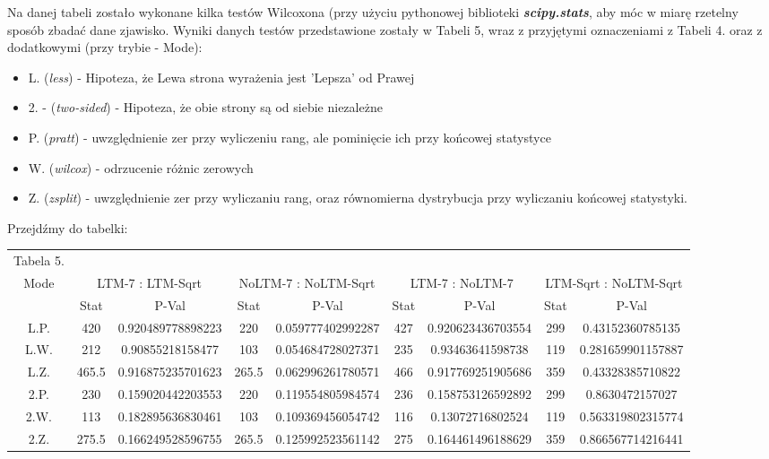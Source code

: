 \documentclass{article}
\begin{document}
Na danej tabeli zostało wykonane kilka testów Wilcoxona (przy użyciu pythonowej biblioteki \textbf{\textit{scipy.stats}}, aby móc w miarę rzetelny sposób zbadać dane zjawisko. Wyniki danych testów przedstawione zostały w Tabeli 5, wraz z przyjętymi oznaczeniami z Tabeli 4. oraz z dodatkowymi (przy trybie - Mode):
\begin{itemize}
	\item L. (\textit{less}) - Hipoteza, że Lewa strona wyrażenia jest 'Lepsza' od Prawej
	\item 2. - (\textit{two-sided}) - Hipoteza, że obie strony są od siebie niezależne
	\item P. (\textit{pratt}) - uwzględnienie zer przy wyliczeniu rang, ale pominięcie ich przy końcowej statystyce
	\item W. (\textit{wilcox}) - odrzucenie różnic zerowych
	\item Z. (\textit{zsplit}) - uwzględnienie zer przy wyliczaniu rang, oraz równomierna dystrybucja przy wyliczaniu końcowej statystyki.
\end{itemize}

Przejdźmy do tabelki:
\begin{table}[h!]
	\centering
	\begin{tabular}{c||c|c|c|c|c|c|c|c}
	Tabela 5.\\
\multirow {2}{*}{Mode} & \multicolumn{2}{c|}{LTM-7 : LTM-Sqrt} & \multicolumn{2}{c|}{NoLTM-7 : NoLTM-Sqrt} & \multicolumn{2}{c|}{LTM-7 : NoLTM-7} & \multicolumn{2}{c}{LTM-Sqrt : NoLTM-Sqrt} \\
\cline{2-9}
 & Stat & P-Val & Stat & P-Val & Stat & P-Val & Stat & P-Val \\
 \hline
L.P. & 420 & 0.920489778898223 & 220 & 0.059777402992287 & 427 & 0.920623436703554 & 299 & 0.43152360785135 \\
L.W. & 212 & 0.90855218158477 & 103 & 0.054684728027371 & 235 & 0.93463641598738 & 119 & 0.281659901157887 \\
L.Z. & 465.5 & 0.916875235701623 & 265.5 & 0.062996261780571 & 466 & 0.917769251905686 & 359 & 0.43328385710822 \\
\hline
2.P. & 230 & 0.159020442203553 & 220 & 0.119554805984574 & 236 & 0.158753126592892 & 299 & 0.8630472157027 \\
2.W. & 113 & 0.182895636830461 & 103 & 0.109369456054742 & 116 & 0.13072716802524 & 119 & 0.563319802315774 \\
2.Z. & 275.5 & 0.166249528596755 & 265.5 & 0.125992523561142 & 275 & 0.164461496188629 & 359 & 0.866567714216441 \\

\end{tabular}
\end{table}
\end{document}
